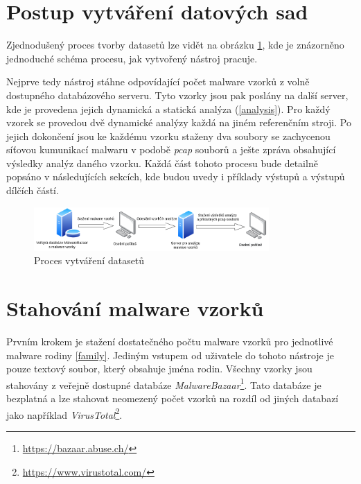 
\section{Postup vytváření datových sad}
Zjednodušený proces tvorby datasetů lze vidět na obrázku \ref{pipeline}, kde je znázorněno jednoduché schéma procesu, jak vytvořený nástroj pracuje. 

Nejprve tedy nástroj stáhne odpovídající počet malware vzorků z volně dostupného databázového serveru. Tyto vzorky jsou pak poslány na další server, kde je provedena jejich dynamická a statická analýza (\ref{analysis}).
Pro každý vzorek se provedou dvě dynamické analýzy každá na jiném referenčním stroji.
Po jejich dokončení jsou ke každému vzorku staženy dva soubory se zachycenou síťovou kumunikací malwaru v podobě \textit{pcap} souborů a ješte zpráva obsahující výsledky analýz daného vzorku.
Každá část tohoto procesu bude detailně popsáno v následujících sekcích, kde budou uvedy i příklady výstupů a výstupů dílčích částí.\\

\begin{figure}[h]
	\centering
        \includegraphics[width=0.8\textwidth]{obrazky/pipeline.png}
	\caption{Proces vytváření datasetů}
    \label{pipeline}
\end{figure}

\section{Stahování malware vzorků}
Prvním krokem je stažení dostatečného počtu malware vzorků pro jednotlivé malware rodiny \ref{family}. Jediným vstupem od uživatele do tohoto nástroje je pouze textový soubor, který obsahuje
jména rodin. Všechny vzorky jsou stahovány z veřejně dostupné databáze \textit{MalwareBazaar}\footnote{\href{https://bazaar.abuse.ch/}{https://bazaar.abuse.ch/}}. Tato databáze je 
bezplatná a lze stahovat neomezený počet vzorků na rozdíl od jiných databazí jako například \textit{VirusTotal}\footnote{\href{https://www.virustotal.com/gui/home/upload}{https://www.virustotal.com/}}.

